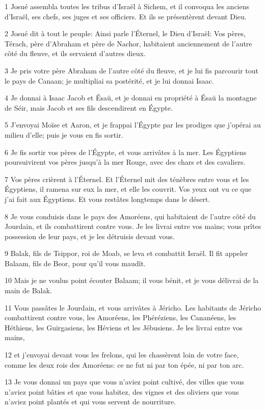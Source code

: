 \par 1 Josué assembla toutes les tribus d'Israël à Sichem, et il convoqua les anciens d'Israël, ses chefs, ses juges et ses officiers. Et ils se présentèrent devant Dieu.
\par 2 Josué dit à tout le peuple: Ainsi parle l'Éternel, le Dieu d'Israël: Vos pères, Térach, père d'Abraham et père de Nachor, habitaient anciennement de l'autre côté du fleuve, et ils servaient d'autres dieux.
\par 3 Je pris votre père Abraham de l'autre côté du fleuve, et je lui fis parcourir tout le pays de Canaan; je multipliai sa postérité, et je lui donnai Isaac.
\par 4 Je donnai à Isaac Jacob et Ésaü, et je donnai en propriété à Ésaü la montagne de Séir, mais Jacob et ses fils descendirent en Égypte.
\par 5 J'envoyai Moïse et Aaron, et je frappai l'Égypte par les prodiges que j'opérai au milieu d'elle; puis je vous en fis sortir.
\par 6 Je fis sortir vos pères de l'Égypte, et vous arrivâtes à la mer. Les Égyptiens poursuivirent vos pères jusqu'à la mer Rouge, avec des chars et des cavaliers.
\par 7 Vos pères crièrent à l'Éternel. Et l'Éternel mit des ténèbres entre vous et les Égyptiens, il ramena sur eux la mer, et elle les couvrit. Vos yeux ont vu ce que j'ai fait aux Égyptiens. Et vous restâtes longtemps dans le désert.
\par 8 Je vous conduisis dans le pays des Amoréens, qui habitaient de l'autre côté du Jourdain, et ils combattirent contre vous. Je les livrai entre vos mains; vous prîtes possession de leur pays, et je les détruisis devant vous.
\par 9 Balak, fils de Tsippor, roi de Moab, se leva et combattit Israël. Il fit appeler Balaam, fils de Beor, pour qu'il vous maudît.
\par 10 Mais je ne voulus point écouter Balaam; il vous bénit, et je vous délivrai de la main de Balak.
\par 11 Vous passâtes le Jourdain, et vous arrivâtes à Jéricho. Les habitants de Jéricho combattirent contre vous, les Amoréens, les Phéréziens, les Cananéens, les Héthiens, les Guirgasiens, les Héviens et les Jébusiens. Je les livrai entre vos mains,
\par 12 et j'envoyai devant vous les frelons, qui les chassèrent loin de votre face, comme les deux rois des Amoréens: ce ne fut ni par ton épée, ni par ton arc.
\par 13 Je vous donnai un pays que vous n'aviez point cultivé, des villes que vous n'aviez point bâties et que vous habitez, des vignes et des oliviers que vous n'aviez point plantés et qui vous servent de nourriture.
